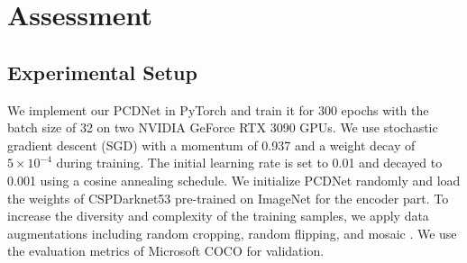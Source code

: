 \section{Assessment}
\label{sec:assessment}
\subsection{Experimental Setup}
We implement our PCDNet in PyTorch \cite{paszke2019pytorch} and train it for 300 epochs with the batch size of 32 on two NVIDIA GeForce RTX 3090 GPUs. We use stochastic gradient descent (SGD) \cite{amari1993backpropagation} with a momentum of 0.937 and a weight decay of $5 \times 10 ^{-4}$ during training. The initial learning rate is set to 0.01 and decayed to 0.001 using a cosine annealing schedule. We initialize PCDNet randomly and load the weights of CSPDarknet53 \cite{wang2020cspnet} pre-trained on ImageNet \cite{imagenet_cvpr09} for the encoder part. To increase the diversity and complexity of the training samples, we apply data augmentations including random cropping, random flipping, and mosaic \cite{redmon2018yolov3}. We use the evaluation metrics of Microsoft COCO \cite{lin2014microsoft} for validation.

